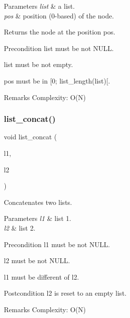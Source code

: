 \begin{DoxyParams}{Parameters}
{\em list} & a list. \\
\hline
{\em pos} & position (0-\/based) of the node. \\
\hline
\end{DoxyParams}
\begin{DoxyReturn}{Returns}
the node at the position {\ttfamily pos}.
\end{DoxyReturn}
\begin{DoxyPrecond}{Precondition}
{\ttfamily list} must be not N\+U\+LL. 

{\ttfamily list} must be not empty. 

{\ttfamily pos} must be in [0; list\+\_\+length(list)[.
\end{DoxyPrecond}
\begin{DoxyRemark}{Remarks}
Complexity\+: O(\+N) 
\end{DoxyRemark}
\mbox{\label{list_8c_af71fffc666f138957b1e015fdae5fe1f}} 
\subsubsection{list\+\_\+concat()}
{\footnotesize\ttfamily void list\+\_\+concat (\begin{DoxyParamCaption}\item[{struct \textbf{ list} $\ast$}]{l1,  }\item[{struct \textbf{ list} $\ast$}]{l2 }\end{DoxyParamCaption})\hspace{0.3cm}{\ttfamily [inline]}}

Concatenates two lists.


\begin{DoxyParams}{Parameters}
{\em l1} & list 1. \\
\hline
{\em l2} & list 2.\\
\hline
\end{DoxyParams}
\begin{DoxyPrecond}{Precondition}
{\ttfamily l1} must be not N\+U\+LL. 

{\ttfamily l2} must be not N\+U\+LL. 

{\ttfamily l1} must be different of {\ttfamily l2}.
\end{DoxyPrecond}
\begin{DoxyPostcond}{Postcondition}
{\ttfamily l2} is reset to an empty list.
\end{DoxyPostcond}
\begin{DoxyRemark}{Remarks}
Complexity\+: O(\+N) 
\end{DoxyRemark}
\mbox{\label{list_8c_a4ee9116bc5b8f1b5da93f415d8529d58}} 
